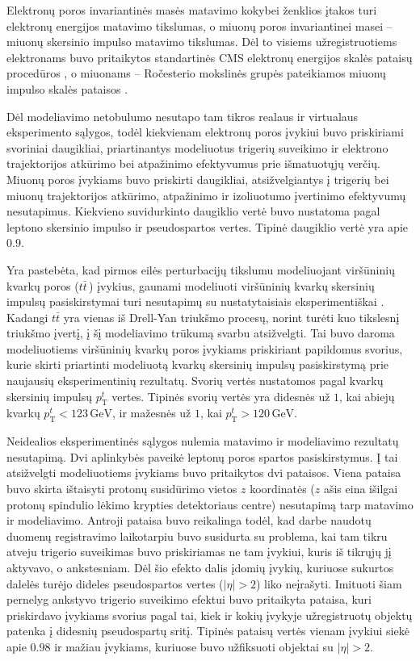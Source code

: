 \documentclass[a4paper, 12pt, oneside]{article}
\begin{document}
Elektronų poros invariantinės masės matavimo kokybei ženklios įtakos turi elektronų energijos matavimo
tikslumas, o miuonų poros invariantinei masei -- miuonų skersinio impulso matavimo tikslumas.
Dėl to visiems užregistruotiems elektronams buvo pritaikytos standartinės CMS elektronų energijos skalės
pataisų procedūros \cite{Ecorr}, o miuonams -- Ročesterio mokslinės grupės pateikiamos miuonų impulso
skalės pataisos \cite{RocCorr}.

Dėl modeliavimo netobulumo nesutapo tam tikros realaus ir virtualaus eksperimento sąlygos, todėl
kiekvienam elektronų poros įvykiui buvo priskiriami svoriniai daugikliai, priartinantys modeliuotus trigerių
suveikimo ir elektrono trajektorijos atkūrimo bei atpažinimo efektyvumus prie išmatuotųjų verčių.
Miuonų poros įvykiams buvo priskirti daugikliai, atsižvelgiantys į trigerių bei miuonų trajektorijos atkūrimo,
atpažinimo ir izoliuotumo įvertinimo efektyvumų nesutapimus.
Kiekvieno suvidurkinto daugiklio vertė buvo nustatoma pagal leptono skersinio impulso ir pseudospartos vertes.
Tipinė daugiklio vertė yra apie $0.9$.

Yra pastebėta, kad pirmos eilės perturbacijų tikslumu modeliuojant viršūninių kvarkų poros ($t\bar{t}\,$)
įvykius, gaunami modeliuoti viršūninių kvarkų skersinių impulsų pasiskirstymai turi nesutapimų su nustatytaisiais
eksperimentiškai \cite{ttbarPT}.
Kadangi $t\bar{t}$ yra vienas iš Drell-Yan triukšmo procesų, norint turėti kuo tikslesnį triukšmo įvertį, į šį
modeliavimo trūkumą svarbu atsižvelgti.
Tai buvo daroma modeliuotiems viršūninių kvarkų poros įvykiams priskiriant papildomus svorius, kurie skirti
priartinti modeliuotą kvarkų skersinių impulsų pasiskirstymą prie naujausių eksperimentinių rezultatų.
Svorių vertės nustatomos pagal kvarkų skersinių impulsų $p_{\mathrm{T}}^{t}$ vertes.
Tipinės svorių vertės yra didesnės už $1$, kai abiejų kvarkų $p_{\mathrm{T}}^{t}<123 \, \mathrm{GeV}$, ir mažesnės už $1$,
kai $p_{\mathrm{T}}^{t}>120 \, \mathrm{GeV}$.

Neidealios eksperimentinės sąlygos nulemia matavimo ir modeliavimo rezultatų nesutapimą.
Dvi aplinkybės paveikė leptonų poros spartos pasiskirstymus.
Į tai atsižvelgti modeliuotiems įvykiams buvo pritaikytos dvi pataisos.
Viena pataisa buvo skirta ištaisyti protonų susidūrimo vietos $z$ koordinatės ($z$ ašis eina išilgai protonų
spindulio lėkimo krypties detektoriaus centre) nesutapimą tarp matavimo ir modeliavimo.
Antroji pataisa buvo reikalinga todėl, kad darbe naudotų duomenų registravimo laikotarpiu buvo susidurta su problema,
kai tam tikru atveju trigerio suveikimas buvo priskiriamas ne tam įvykiui, kuris iš tikrųjų jį aktyvavo, o
ankstesniam.
Dėl šio efekto dalis įdomių įvykių, kuriuose sukurtos dalelės turėjo dideles pseudospartos vertes ($|\eta|>2$)
liko neįrašyti.
Imituoti šiam pernelyg ankstyvo trigerio suveikimo efektui buvo pritaikyta pataisa, kuri priskirdavo įvykiams
svorius pagal tai, kiek ir kokių įvykyje užregistruotų objektų patenka į didesnių pseudospartų sritį.
Tipinės pataisų vertės vienam įvykiui siekė apie $0.98$ ir mažiau įvykiams, kuriuose buvo užfiksuoti objektai su
$|\eta|>2$.
\end{document}
